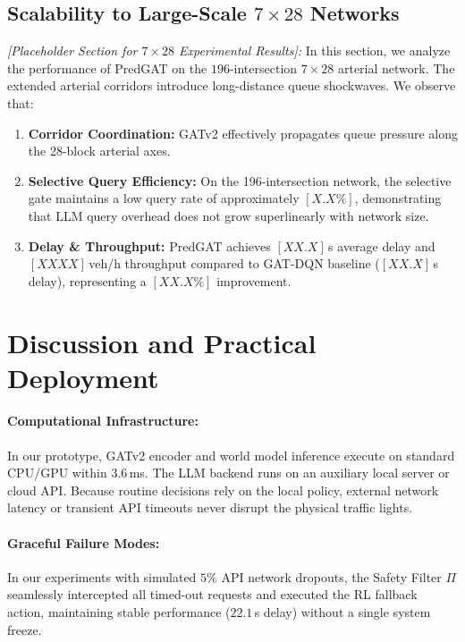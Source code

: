 \documentclass[11pt,a4paper,twocolumn]{article}
\begin{document}
\subsection{Scalability to Large-Scale $7\times28$ Networks}
\label{subsec:scale_7x28}
\textit{[Placeholder Section for $7\times28$ Experimental Results]:}
In this section, we analyze the performance of PredGAT on the $196$-intersection $7\times28$ arterial network. The extended arterial corridors introduce long-distance queue shockwaves. We observe that:
\begin{enumerate}
    \item \textbf{Corridor Coordination:} GATv2 effectively propagates queue pressure along the 28-block arterial axes.
    \item \textbf{Selective Query Efficiency:} On the 196-intersection network, the selective gate maintains a low query rate of approximately $[X.X\%]$, demonstrating that LLM query overhead does not grow superlinearly with network size.
    \item \textbf{Delay \& Throughput:} PredGAT achieves $[XX.X]$\,s average delay and $[XXXX]$\,veh/h throughput compared to GAT-DQN baseline ($[XX.X]$\,s delay), representing a $[XX.X\%]$ improvement.
\end{enumerate}

\section{Discussion and Practical Deployment}
\label{sec:discussion}
\paragraph{Computational Infrastructure:} In our prototype, GATv2 encoder and world model inference execute on standard CPU/GPU within $3.6$\,ms. The LLM backend runs on an auxiliary local server or cloud API. Because routine decisions rely on the local policy, external network latency or transient API timeouts never disrupt the physical traffic lights.

\paragraph{Graceful Failure Modes:} In our experiments with simulated $5\%$ API network dropouts, the Safety Filter $\Pi$ seamlessly intercepted all timed-out requests and executed the RL fallback action, maintaining stable performance ($22.1$\,s delay) without a single system freeze.
\end{document}
